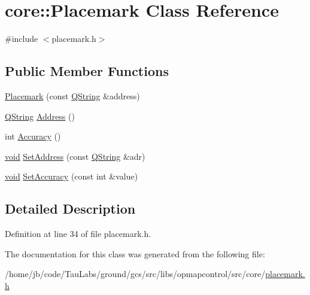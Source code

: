 \hypertarget{classcore_1_1_placemark}{\section{core\-:\-:\-Placemark \-Class \-Reference}
\label{classcore_1_1_placemark}
}


{\ttfamily \#include $<$placemark.\-h$>$}

\subsection*{\-Public \-Member \-Functions}
\begin{DoxyCompactItemize}
\item 
\hyperlink{group___o_p_map_widget_gab9298de24074616417ed9c9eee1e3fcc}{\-Placemark} (const \hyperlink{group___u_a_v_objects_plugin_gab9d252f49c333c94a72f97ce3105a32d}{\-Q\-String} \&address)
\item 
\hyperlink{group___u_a_v_objects_plugin_gab9d252f49c333c94a72f97ce3105a32d}{\-Q\-String} \hyperlink{group___o_p_map_widget_ga6954c8bd25b9e37d34b49c03a88a33db}{\-Address} ()
\item 
int \hyperlink{group___o_p_map_widget_ga35e7221f35ac45cd6b658ec7aaefe9f0}{\-Accuracy} ()
\item 
\hyperlink{group___u_a_v_objects_plugin_ga444cf2ff3f0ecbe028adce838d373f5c}{void} \hyperlink{group___o_p_map_widget_gab54288ead0f6c2ce83424449ae9c0fe9}{\-Set\-Address} (const \hyperlink{group___u_a_v_objects_plugin_gab9d252f49c333c94a72f97ce3105a32d}{\-Q\-String} \&adr)
\item 
\hyperlink{group___u_a_v_objects_plugin_ga444cf2ff3f0ecbe028adce838d373f5c}{void} \hyperlink{group___o_p_map_widget_gaf3816263edb9fd676defbb9332a69624}{\-Set\-Accuracy} (const int \&value)
\end{DoxyCompactItemize}


\subsection{\-Detailed \-Description}


\-Definition at line 34 of file placemark.\-h.



\-The documentation for this class was generated from the following file\-:\begin{DoxyCompactItemize}
\item 
/home/jb/code/\-Tau\-Labs/ground/gcs/src/libs/opmapcontrol/src/core/\hyperlink{placemark_8h}{placemark.\-h}\end{DoxyCompactItemize}
